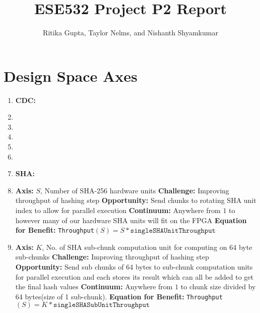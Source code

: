 \documentclass{article}
\title{ESE532 Project P2 Report}
\author{Ritika Gupta, Taylor Nelms, and Nishanth Shyamkumar}
\begin{document}
\maketitle


\section{Design Space Axes}
\begin{enumerate}
\item%

\textbf{CDC:}

\item%

\item%

\item%

\item%

\item%

\item%


\textbf{SHA:}
\item%

\textbf{Axis:} $S$, Number of SHA-256 hardware units
\newline
\textbf{Challenge:} Improving throughput of hashing step
\newline
\textbf{Opportunity:} Send chunks to rotating SHA unit index to allow for parallel execution
\newline
\textbf{Continuum:} Anywhere from $1$ to however many of our hardware SHA units will fit on the FPGA
\newline
\textbf{Equation for Benefit:} \texttt{Throughput}$\left(S\right)=S*\texttt{singleSHAUnitThroughput}$

\item%

\textbf{Axis:} $K$, No. of SHA sub-chunk computation unit for computing on 64 byte sub-chunks
\newline
\textbf{Challenge:} Improving throughput of hashing step
\newline
\textbf{Opportunity:} Send sub chunks of 64 bytes to sub-chunk computation units for parallel execution and each stores its result which can all be added to get the final hash values
\newline
\textbf{Continuum:} Anywhere from $1$ to chunk size divided by 64 bytes(size of 1 sub-chunk).  
\newline
\textbf{Equation for Benefit:} \texttt{Throughput}$\left(S\right)=K*\texttt{singleSHASubUnitThroughput}$


\end{enumerate}
\end{document}
